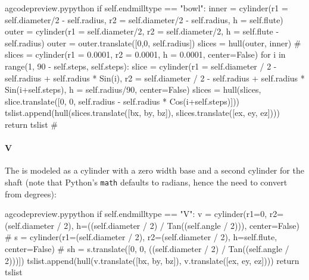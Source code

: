 \documentclass{ltxdoc}
\begin{document}
\lstset{firstnumber=\thegcpy}
\begin{writecode}{a}{gcodepreview.py}{python}
        if self.endmilltype == "bowl":
            inner = cylinder(r1 = self.diameter/2 - self.radius, r2 = self.diameter/2 - self.radius, h = self.flute)
            outer = cylinder(r1 = self.diameter/2, r2 = self.diameter/2, h = self.flute - self.radius)
            outer = outer.translate([0,0, self.radius])
            slices = hull(outer, inner)
#    slices = cylinder(r1 = 0.0001, r2 = 0.0001, h = 0.0001, center=False)
            for i in range(1, 90 - self.steps, self.steps):
                slice = cylinder(r1 = self.diameter / 2 - self.radius + self.radius * Sin(i), r2 = self.diameter / 2 - self.radius + self.radius * Sin(i+self.steps), h = self.radius/90, center=False)
                slices = hull(slices, slice.translate([0, 0, self.radius - self.radius * Cos(i+self.steps)]))
            tslist.append(hull(slices.translate([bx, by, bz]), slices.translate([ex, ey, ez])))
            return tslist
#
\end{writecode}
\addtocounter{gcpy}{12}

\paragraph{V}

The  is modeled as a cylinder with a zero width base and a second cylinder for the shaft (note that Python's \verb|math| defaults to radians, hence the need to convert from degrees):

%

\lstset{firstnumber=\thegcpy}
\begin{writecode}{a}{gcodepreview.py}{python}
        if self.endmilltype == "V":
            v = cylinder(r1=0, r2=(self.diameter / 2), h=((self.diameter / 2) / Tan((self.angle / 2))), center=False)
#                s = cylinder(r1=(self.diameter / 2), r2=(self.diameter / 2), h=self.flute, center=False)
#                sh = s.translate([0, 0, ((self.diameter / 2) / Tan((self.angle / 2)))])
            tslist.append(hull(v.translate([bx, by, bz]), v.translate([ex, ey, ez])))
            return tslist

\end{writecode}
\addtocounter{gcpy}{7}
\end{document}
